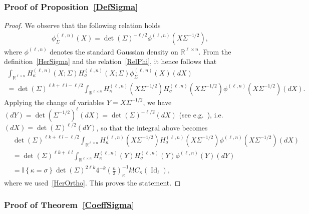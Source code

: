 \documentclass[AHL,Unicode,longabstracts,published]{cedram}
\DeclareMathOperator{\Id}{Id}
\newcommand{\R}{\mathbb{R}}
\newcommand{\ind}[1]{\mathbb{I}
\left\{#1\right\}}
\begin{document}
\subsubsection*{Proof of Proposition~\ref{DefSigma}}

\begin{proof}
We observe that the following relation holds
\begin{gather}\label{RelPhi}
\phi^{(\ell,n)}_{\Sigma}(X) = \det(\Sigma)^{-\ell/2} \phi^{(\ell,n)}\left(X\Sigma^{-1/2}\right),
\end{gather}
where $\phi^{(\ell,n)}$ denotes the standard Gaussian density on $\R^{\ell \times n}$. From the definition~\eqref{HerSigma} and the relation~\eqref{RelPhi}, it hence follows that
\begin{multline*}
\int_{\R^{\ell \times n}} H^{(\ell,n)}_{\kappa}(X;\Sigma) H^{(\ell,n)}_{\sigma}(X;\Sigma)\phi^{(\ell,n)}_{\Sigma}(X)(dX) \\
= \det(\Sigma)^{\ell k+\ell l-\ell/2}\int_{\R^{\ell\times n} } H_{\kappa}^{(\ell,n)}\left(X\Sigma^{-1/2}\right) H_{\sigma}^{(\ell,n)}\left(X\Sigma^{-1/2}\right) \phi^{(\ell,n)}\left(X\Sigma^{-1/2}\right) (dX).
\end{multline*}
Applying the change of variables $Y=X\Sigma^{-1/2}$, we have $(dY) = \det(\Sigma^{-1/2})^{\ell}(dX) = \det(\Sigma)^{-\ell/2} (dX)$ (see e.g.~\cite[Theorem~2.1.5]{Muir}), i.e. $(dX) = \det(\Sigma)^{\ell/2} (dY)$, so that the integral above becomes
\begin{align*}
&\det(\Sigma)^{\ell k+\ell l-\ell/2}\int_{\R^{\ell \times n}} H_{\kappa}^{(\ell,n)}\left(X\Sigma^{-1/2}\right) H_{\sigma}^{(\ell,n)}(X\Sigma^{-1/2}) \phi^{(\ell,n)}\left(X\Sigma^{-1/2}\right) (dX) \\
&= \det(\Sigma)^{\ell k+\ell l }\int_{\R^{\ell \times n}} H_{\kappa}^{(\ell,n)}(Y) H_{\sigma}^{(\ell,n)}(Y) \phi^{(\ell,n)}(Y) (dY) \\
&= \ind{\kappa=\sigma} \det(\Sigma)^{2\ell k}4^{-k}\left(\frac{n}{2}\right)_{\kappa}^{-1} k !C_{\kappa}(\Id_{\ell}),
\end{align*}
where we used~\eqref{HerOrtho}. This proves the statement.
\end{proof}

\subsubsection*{Proof of Theorem~\ref{CoeffSigma}}
\end{document}
